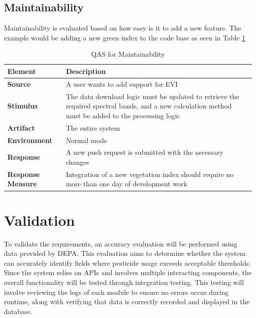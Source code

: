 \subsection{Maintainability}
Maintainability is evaluated based on how easy is it to add a new feature. The example would be adding a new green index to the code base as seen in Table \ref{tab:QAMain}

\begin{table}[H]
    \centering
    \begin{tabular}{p{}|p{}}
         \hline
         \textbf{Element} & \textbf{Description} \\
         \hline
         \textbf{Source} & A user wants to add support for EVI \\
         \textbf{Stimulus} & The data download logic must be updated to retrieve the required spectral bands, and a new calculation method must be added to the processing logic \\
         \textbf{Artifact} & The entire system \\
         \textbf{Environment} & Normal mode \\
         \textbf{Response} & A new push request is submitted with the necessary changes \\
         \textbf{Response Measure} & Integration of a new vegetation index should require no more than one day of development work
    \end{tabular}
    \caption{QAS for Maintainability}
    \label{tab:QAMain}
\end{table}



\section{Validation}\label{SE_Validation}
To validate the requirements, an accuracy evaluation will be performed using data provided by \acrshort{DEPA}. This evaluation aims to determine whether the system can accurately identify fields where pesticide usage exceeds acceptable thresholds. \\
Since the system relies on APIs and involves multiple interacting components, the overall functionality will be tested through integration testing. This testing will involve reviewing the logs of each module to ensure no errors occur during runtime, along with verifying that data is correctly recorded and displayed in the database.


